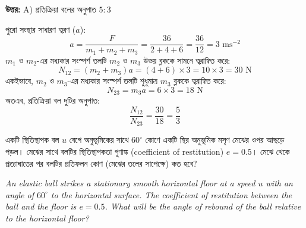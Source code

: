 \documentclass[12pt, a4paper]{article}
\begin{document}
{\vspace{0.5em}
\begin{tcolorbox}[answerbox]
\textbf{\color{success} উত্তর:} A) প্রতিক্রিয়া বলের অনুপাত $5 : 3$
\end{tcolorbox}
\vspace{1em}

\begin{tcolorbox}[solutionbox={সমাধান (Solution)}]
\noindent
পুরো সংস্থার সাধারণ ত্বরণ ($a$):
$$a = \frac{F}{m_1 + m_2 + m_3} = \frac{36}{2 + 4 + 6} = \frac{36}{12} = 3\text{ ms}^{-2}$$
$m_1$ ও $m_2$-এর মধ্যকার সংস্পর্শ তলটি $m_2$ ও $m_3$ উভয় ব্লককে সামনে ত্বরান্বিত করে:
$$N_{12} = (m_2 + m_3) a = (4 + 6) \times 3 = 10 \times 3 = 30\text{ N}$$
একইভাবে, $m_2$ ও $m_3$-এর মধ্যকার সংস্পর্শ তলটি শুধুমাত্র $m_3$ ব্লককে ত্বরান্বিত করে:
$$N_{23} = m_3 a = 6 \times 3 = 18\text{ N}$$
অতএব, প্রতিক্রিয়া বল দুটির অনুপাত:
$$\frac{N_{12}}{N_{23}} = \frac{30}{18} = \frac{5}{3}$$
\end{tcolorbox}

\begin{tcolorbox}[questionbox={প্রশ্ন (Question) 21}]
\noindent
একটি স্থিতিস্থাপক বল $u$ বেগে অনুভূমিকের সাথে $60^\circ$ কোণে একটি স্থির অনুভূমিক মসৃণ মেঝের ওপর আছড়ে পড়ল। মেঝের সাথে বলটির স্থিতিস্থাপকতা গুণাঙ্ক (coefficient of restitution) $e = 0.5$। মেঝে থেকে প্রত্যাঘাতের পর বলটির প্রতিফলন কোণ (মেঝের তলের সাপেক্ষে) কত হবে?

\vspace{0.8em}
\begin{english}
\noindent\textit{\color{darkgray}
An elastic ball strikes a stationary smooth horizontal floor at a speed $u$ with an angle of $60^\circ$ to the horizontal surface. The coefficient of restitution between the ball and the floor is $e = 0.5$. What will be the angle of rebound of the ball relative to the horizontal floor?
}
\end{english}
\end{tcolorbox}

\vspace{1em}
\begin{center}
\end{center}}
\end{document}
